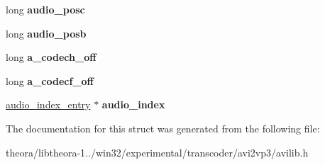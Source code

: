 \begin{DoxyCompactItemize}
\item 
\hypertarget{structtrack__s_a1f52d07737ebed8a80779c8e0eb5df80}{long {\bfseries audio\+\_\+posc}}\label{structtrack__s_a1f52d07737ebed8a80779c8e0eb5df80}

\item 
\hypertarget{structtrack__s_aacb51782a223b18c7a8f901406db6605}{long {\bfseries audio\+\_\+posb}}\label{structtrack__s_aacb51782a223b18c7a8f901406db6605}

\item 
\hypertarget{structtrack__s_a812164084e6bf88a04b9019b27a5d440}{long {\bfseries a\+\_\+codech\+\_\+off}}\label{structtrack__s_a812164084e6bf88a04b9019b27a5d440}

\item 
\hypertarget{structtrack__s_aa0d4c8ea816c0fc52dfec01234eda446}{long {\bfseries a\+\_\+codecf\+\_\+off}}\label{structtrack__s_aa0d4c8ea816c0fc52dfec01234eda446}

\item 
\hypertarget{structtrack__s_a5613ee8e4ec9be1205bc20b32e06a964}{\hyperlink{structaudio__index__entry}{audio\+\_\+index\+\_\+entry} $\ast$ {\bfseries audio\+\_\+index}}\label{structtrack__s_a5613ee8e4ec9be1205bc20b32e06a964}

\end{DoxyCompactItemize}


The documentation for this struct was generated from the following file\+:\begin{DoxyCompactItemize}
\item 
theora/libtheora-\/1../win32/experimental/transcoder/avi2vp3/avilib.\+h\end{DoxyCompactItemize}
